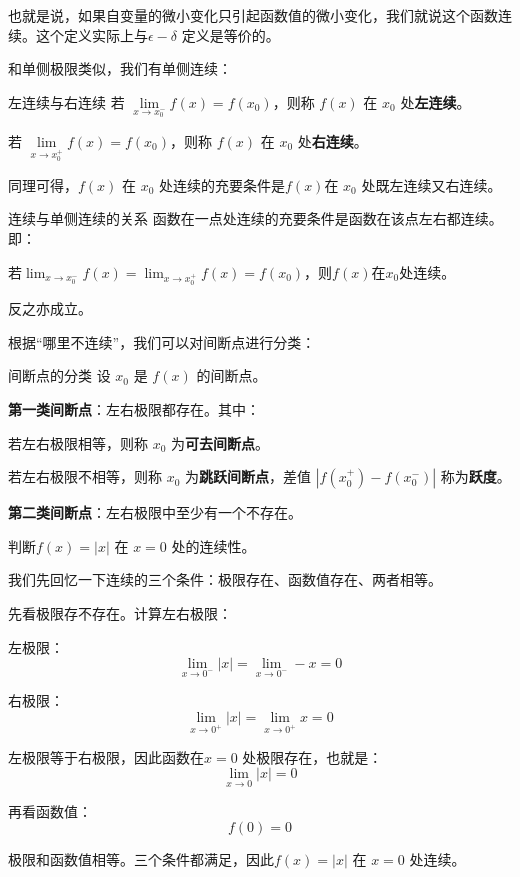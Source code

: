 也就是说，如果自变量的微小变化只引起函数值的微小变化，我们就说这个函数连续。这个定义实际上与$\epsilon-\delta$ 定义是等价的。

和单侧极限类似，我们有单侧连续：

\begin{definition}{左连续与右连续}{}
若 $\lim\limits_{x \to x_0^-} f(x) = f(x_0)$，则称 $f(x)$ 在 $x_0$ 处\textbf{左连续}。

若 $\lim\limits_{x \to x_0^+} f(x) = f(x_0)$，则称 $f(x)$ 在 $x_0$ 处\textbf{右连续}。

\end{definition}

同理可得，$f(x)$ 在 $x_0$ 处连续的充要条件是$f(x)$在 $x_0$ 处既左连续又右连续。

\begin{theorem}{连续与单侧连续的关系}{}
  函数在一点处连续的充要条件是函数在该点左右都连续。即：

  \begin{center}
    若\(\lim_{x \to x_0^-} f(x) = \lim_{x \to x_0^+} f(x) = f(x_0)\)，则\(f(x)\)在\(x_0\)处连续。
  \end{center}

  反之亦成立。

\end{theorem}

根据“哪里不连续”，我们可以对间断点进行分类：

\begin{definition}{间断点的分类}{}
设 $x_0$ 是 $f(x)$ 的间断点。

\textbf{第一类间断点}：左右极限都存在。其中：

若左右极限相等，则称 $x_0$ 为\textbf{可去间断点}。

若左右极限不相等，则称 $x_0$ 为\textbf{跳跃间断点}，差值 $|f(x_0^+) - f(x_0^-)|$ 称为\textbf{跃度}。

\textbf{第二类间断点}：左右极限中至少有一个不存在。
\end{definition}

\begin{myexample}
  判断$f(x) = |x|$ 在 $x=0$ 处的连续性。

  我们先回忆一下连续的三个条件：极限存在、函数值存在、两者相等。

  先看极限存不存在。计算左右极限：

  左极限：
\[
\lim_{x \to 0^-} |x| = \lim_{x \to 0^-}-x= 0
\]

右极限：
\[
\lim_{x \to 0^+} |x| = \lim_{x \to 0^+}x= 0
\]

左极限等于右极限，因此函数在$x=0$ 处极限存在，也就是：
\[
\lim_{x \to 0} |x| =0
\]

再看函数值：
\[
f(0) = 0
\]

极限和函数值相等。三个条件都满足，因此$f(x) = |x|$ 在 $x=0$ 处连续。

\end{myexample}

